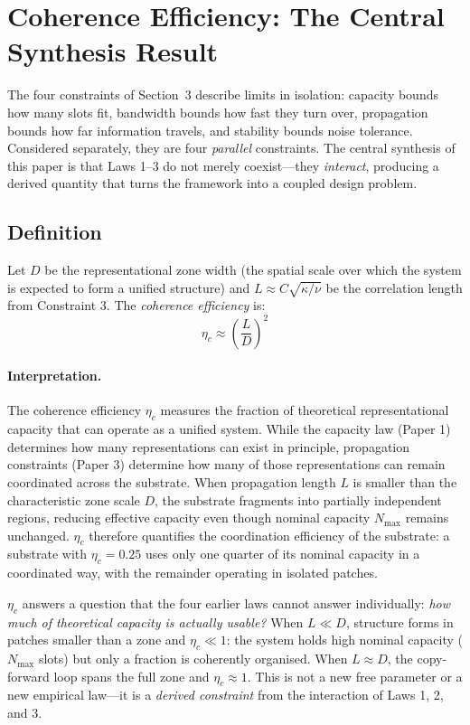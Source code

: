 \documentclass[11pt]{article}
\begin{document}
\section{Coherence Efficiency: The Central Synthesis Result}
\label{sec:coherence}

The four constraints of Section~3 describe limits in isolation: capacity bounds how many slots fit, bandwidth bounds how fast they turn over, propagation bounds how far information travels, and stability bounds noise tolerance. Considered separately, they are four \emph{parallel} constraints. The central synthesis of this paper is that Laws 1--3 do not merely coexist---they \emph{interact}, producing a derived quantity that turns the framework into a coupled design problem.

\subsection{Definition}

Let $D$ be the representational zone width (the spatial scale over which the system is expected to form a unified structure) and $L \approx C\sqrt{\kappa/\nu}$ be the correlation length from Constraint 3. The \emph{coherence efficiency} is:
\begin{equation}
  \eta_c \approx \left(\frac{L}{D}\right)^2
  \label{eq:eta_c}
\end{equation}

\paragraph{Interpretation.} The coherence efficiency $\eta_c$ measures the fraction of theoretical representational capacity that can operate as a unified system. While the capacity law (Paper 1) determines how many representations can exist in principle, propagation constraints (Paper 3) determine how many of those representations can remain coordinated across the substrate. When propagation length $L$ is smaller than the characteristic zone scale $D$, the substrate fragments into partially independent regions, reducing effective capacity even though nominal capacity $N_{\max}$ remains unchanged. $\eta_c$ therefore quantifies the coordination efficiency of the substrate: a substrate with $\eta_c = 0.25$ uses only one quarter of its nominal capacity in a coordinated way, with the remainder operating in isolated patches.

$\eta_c$ answers a question that the four earlier laws cannot answer individually: \emph{how much of theoretical capacity is actually usable?} When $L \ll D$, structure forms in patches smaller than a zone and $\eta_c \ll 1$: the system holds high nominal capacity ($N_{\max}$ slots) but only a fraction is coherently organised. When $L \approx D$, the copy-forward loop spans the full zone and $\eta_c \approx 1$. This is not a new free parameter or a new empirical law---it is a \emph{derived constraint} from the interaction of Laws 1, 2, and 3.
\end{document}
